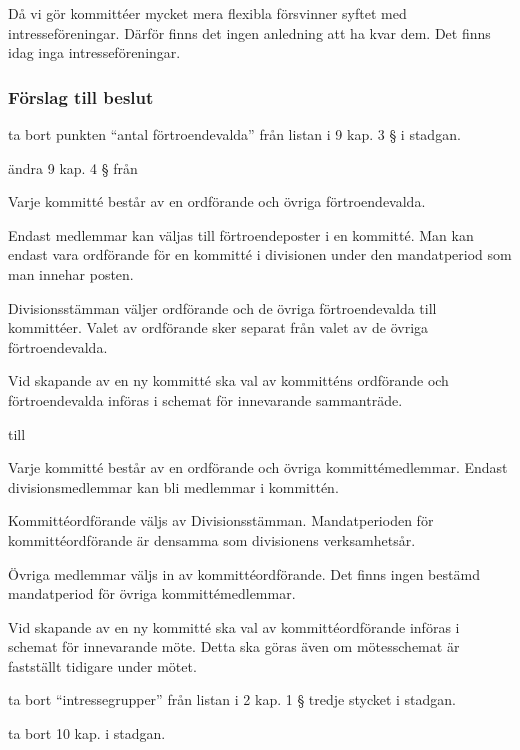 \documentclass[protokoll]{dvd}
\begin{document}
Då vi gör kommittéer mycket mera flexibla försvinner syftet med intresseföreningar.
Därför finns det ingen anledning att ha kvar dem.
Det finns idag inga intresseföreningar.

\subsubsection*{Förslag till beslut}

\begin{attsatser}
	\item ta bort punkten ``antal förtroendevalda'' från listan i 9 kap. 3 § i stadgan.
	\item ändra 9 kap. 4 § från

	\begin{displayquote}
		Varje kommitté består av en ordförande och övriga förtroendevalda.

		Endast medlemmar kan väljas till förtroendeposter i en kommitté.
		Man kan endast vara ordförande för en kommitté i divisionen under den mandatperiod som man innehar posten.

		Divisionsstämman väljer ordförande och de övriga förtroendevalda till kommittéer.
		Valet av ordförande sker separat från valet av de övriga förtroendevalda.

		Vid skapande av en ny kommitté ska val av kommitténs ordförande och förtroendevalda införas i schemat för innevarande sammanträde.
	\end{displayquote}

	till

	\begin{displayquote}
		Varje kommitté består av en ordförande och övriga kommittémedlemmar.
		Endast divisionsmedlemmar kan bli medlemmar i kommittén.

		Kommittéordförande väljs av Divisionsstämman.
		Mandatperioden för kommittéordförande är densamma som divisionens verksamhetsår.

		Övriga medlemmar väljs in av kommittéordförande.
		Det finns ingen bestämd mandatperiod för övriga kommittémedlemmar.

		Vid skapande av en ny kommitté ska val av kommittéordförande införas i schemat för innevarande möte.
		Detta ska göras även om mötesschemat är fastställt tidigare under mötet.
	\end{displayquote}

	\item ta bort ``intressegrupper'' från listan i 2 kap. 1 § tredje stycket i stadgan.
	\item ta bort 10 kap. i stadgan.
\end{attsatser}
\end{document}
